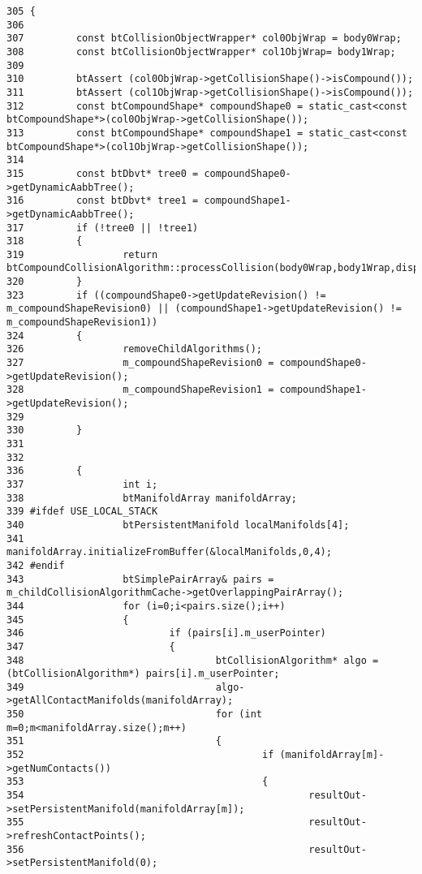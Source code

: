 \begin{Code}\begin{verbatim}305 {
306 
307         const btCollisionObjectWrapper* col0ObjWrap = body0Wrap;
308         const btCollisionObjectWrapper* col1ObjWrap= body1Wrap;
309 
310         btAssert (col0ObjWrap->getCollisionShape()->isCompound());
311         btAssert (col1ObjWrap->getCollisionShape()->isCompound());
312         const btCompoundShape* compoundShape0 = static_cast<const btCompoundShape*>(col0ObjWrap->getCollisionShape());
313         const btCompoundShape* compoundShape1 = static_cast<const btCompoundShape*>(col1ObjWrap->getCollisionShape());
314 
315         const btDbvt* tree0 = compoundShape0->getDynamicAabbTree();
316         const btDbvt* tree1 = compoundShape1->getDynamicAabbTree();
317         if (!tree0 || !tree1)
318         {
319                 return btCompoundCollisionAlgorithm::processCollision(body0Wrap,body1Wrap,dispatchInfo,resultOut);
320         }
323         if ((compoundShape0->getUpdateRevision() != m_compoundShapeRevision0) || (compoundShape1->getUpdateRevision() != m_compoundShapeRevision1))
324         {
326                 removeChildAlgorithms();
327                 m_compoundShapeRevision0 = compoundShape0->getUpdateRevision();
328                 m_compoundShapeRevision1 = compoundShape1->getUpdateRevision();
329 
330         }
331 
332 
336         {
337                 int i;
338                 btManifoldArray manifoldArray;
339 #ifdef USE_LOCAL_STACK 
340                 btPersistentManifold localManifolds[4];
341                 manifoldArray.initializeFromBuffer(&localManifolds,0,4);
342 #endif
343                 btSimplePairArray& pairs = m_childCollisionAlgorithmCache->getOverlappingPairArray();
344                 for (i=0;i<pairs.size();i++)
345                 {
346                         if (pairs[i].m_userPointer)
347                         {
348                                 btCollisionAlgorithm* algo = (btCollisionAlgorithm*) pairs[i].m_userPointer;
349                                 algo->getAllContactManifolds(manifoldArray);
350                                 for (int m=0;m<manifoldArray.size();m++)
351                                 {
352                                         if (manifoldArray[m]->getNumContacts())
353                                         {
354                                                 resultOut->setPersistentManifold(manifoldArray[m]);
355                                                 resultOut->refreshContactPoints();
356                                                 resultOut->setPersistentManifold(0);

\end{verbatim}
\end{Code}
